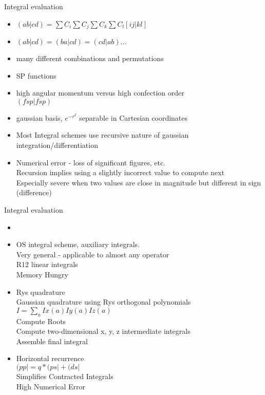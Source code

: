\documentclass{beamer}
\begin{document}
\begin{frame}{   Integral  evaluation}
\begin{itemize}
\item $(ab|cd) = \sum C_i \sum C_j \sum C_k \sum C_l [ij|kl] $
\item $(ab|cd) = (ba|cd) = (cd|ab)...$
\item many different combinations and permutations
\item SP functions
\item high angular momentum versus high confection order\\
$(fsp | fsp)$
\item gaussian basis, $e ^{-r^2}$ separable in Cartesian coordinates
\item  Most Integral schemes use recursive nature of gaussian integration/differentiation
\item Numerical error - loss of significant figures, etc.\\
Recursion implies using a slightly incorrect value to compute next\\
Especially severe when two values are close in magnitude but different in sign (difference)
\end{itemize}
\end{frame}

\begin{frame}{   Integral  evaluation}
\begin{itemize}
\item 
\item OS integral scheme, auxiliary integrals. \\
Very general - applicable to almost any operator\\
R12 linear integrals\\
Memory Hungry
\item Rys quadrature\\
  Gaussian quadrature using Rys orthogonal polynomials\\
  $I = \sum_a Ix(a)Iy(a)Iz(a)$\\
  Compute Roots\\
  Compute two-dimensional x, y, z intermediate integrals\\
  Assemble final integral
\item Horizontal recurrence\\
$(pp | = q*(ps |  + (ds |$\\
Simplifies Contracted Integrals\\
High Numerical Error
\end{itemize}
\end{frame}
\end{document}
